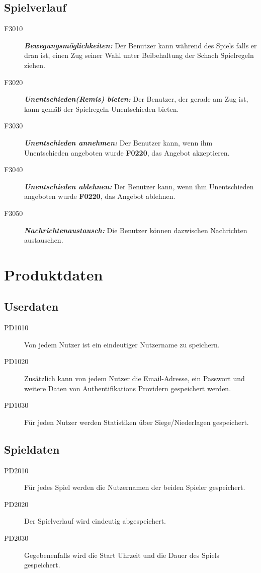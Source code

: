 \documentclass[parskip=full]{scrartcl}
\begin{document}
\subsection{Spielverlauf} 
\begin{description}
	\item[F3010]\textbf{\textit{Bewegungsmöglichkeiten: }}Der Benutzer kann während des Spiels falls er dran ist, einen Zug seiner Wahl unter Beibehaltung der Schach Spielregeln ziehen.
	\item[F3020] \textbf{\textit{Unentschieden(Remis) bieten: }} Der Benutzer, der gerade am Zug ist, kann gemäß der Spielregeln Unentschieden bieten.
	\item[F3030] \textbf{\textit{Unentschieden annehmen: }} Der Benutzer kann, wenn ihm Unentschieden angeboten wurde \textbf{F0220}, das Angebot akzeptieren.
	\item[F3040] \textbf{\textit{Unentschieden ablehnen: }} Der Benutzer kann, wenn ihm Unentschieden angeboten wurde \textbf{F0220}, das Angebot ablehnen.
	\item[F3050]\textbf{\textit{Nachrichtenaustausch: }} Die Benutzer können dazwischen Nachrichten austauschen.
\end{description}

\section{Produktdaten}

\subsection{Userdaten}
\begin{description}
	
\item[PD1010] Von jedem Nutzer ist ein eindeutiger Nutzername zu speichern.
\item[PD1020] Zusätzlich kann von jedem Nutzer die Email-Adresse, ein Passwort 	und weitere Daten von Authentifikations Providern gespeichert werden.
\item [PD1030] Für jeden Nutzer werden Statistiken über Siege/Niederlagen gespeichert.

\end{description}

\subsection{Spieldaten}
\begin{description}
	
\item[PD2010] Für jedes Spiel werden die Nutzernamen der beiden Spieler gespeichert.
\item[PD2020] Der Spielverlauf wird eindeutig abgespeichert.
\item[PD2030] Gegebenenfalls wird die Start Uhrzeit und die Dauer des Spiels gespeichert.

\end{description}
\end{document}
